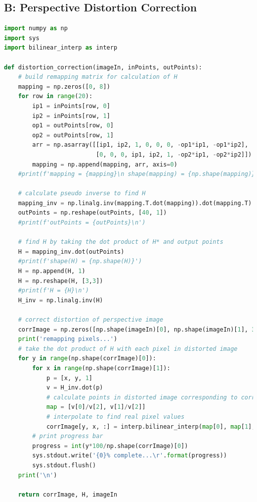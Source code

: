 \documentclass[11pt,a4paper]{article}
\begin{document}
\pagebreak

\subsection{B: Perspective Distortion Correction}
\begin{lstlisting}[language=Python]
import numpy as np
import sys
import bilinear_interp as interp

def distortion_correction(imageIn, inPoints, outPoints):
    # build remapping matrix for calculation of H
    mapping = np.zeros([0, 8])
    for row in range(20):
        ip1 = inPoints[row, 0]
        ip2 = inPoints[row, 1]
        op1 = outPoints[row, 0]
        op2 = outPoints[row, 1]
        arr = np.asarray([[ip1, ip2, 1, 0, 0, 0, -op1*ip1, -op1*ip2],
                          [0, 0, 0, ip1, ip2, 1, -op2*ip1, -op2*ip2]])
        mapping = np.append(mapping, arr, axis=0)
    #print(f'mapping = {mapping}\n shape(mapping) = {np.shape(mapping)}\n')

    # calculate pseudo inverse to find H
    mapping_inv = np.linalg.inv(mapping.T.dot(mapping)).dot(mapping.T)
    outPoints = np.reshape(outPoints, [40, 1])
    #print(f'outPoints = {outPoints}\n')

    # find H by taking the dot product of H* and output points
    H = mapping_inv.dot(outPoints)
    #print(f'shape(H) = {np.shape(H)}')
    H = np.append(H, 1)
    H = np.reshape(H, [3,3])
    #print(f'H = {H}\n')
    H_inv = np.linalg.inv(H)

    # correct distortion of perspective image
    corrImage = np.zeros([np.shape(imageIn)[0], np.shape(imageIn)[1], 3])
    print('remapping pixels...')
    # take the dot product of H with each pixel in distorted image
    for y in range(np.shape(corrImage)[0]):
        for x in range(np.shape(corrImage)[1]):
            p = [x, y, 1]
            v = H_inv.dot(p)
            # calculate points in distorted image corresponding to corrected pixels
            map = [v[0]/v[2], v[1]/v[2]]
            # interpolate to find real pixel values
            corrImage[y, x, :] = interp.bilinear_interp(map[0], map[1], imageIn)
        # print progress bar
        progress = int(y*100/np.shape(corrImage)[0])
        sys.stdout.write('{0}% complete...\r'.format(progress))
        sys.stdout.flush()
    print('\n')

    return corrImage, H, imageIn
\end{lstlisting}

\pagebreak
\end{document}
